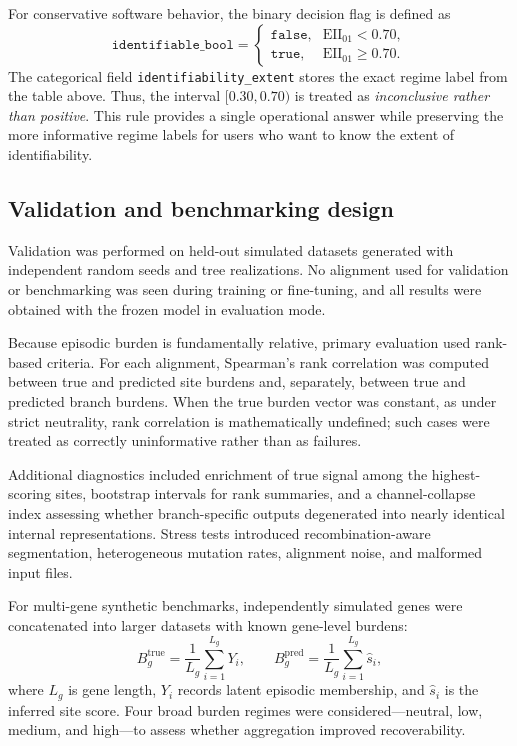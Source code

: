 \documentclass[11pt]{article}
\begin{document}
For conservative software behavior, the binary decision flag is defined as
\[
\texttt{identifiable\_bool}=\begin{cases}
\texttt{false}, & \mathrm{EII}_{01}<0.70,\\
\texttt{true}, & \mathrm{EII}_{01}\ge 0.70.
\end{cases}
\]
The categorical field \texttt{identifiability\_extent} stores the exact regime label from the table above. Thus, the interval $[0.30,0.70)$ is treated as \emph{inconclusive rather than positive}. This rule provides a single operational answer while preserving the more informative regime labels for users who want to know the extent of identifiability.

\subsection{Validation and benchmarking design}

Validation was performed on held-out simulated datasets generated with independent random seeds and tree realizations. No alignment used for validation or benchmarking was seen during training or fine-tuning, and all results were obtained with the frozen model in evaluation mode.

Because episodic burden is fundamentally relative, primary evaluation used rank-based criteria. For each alignment, Spearman's rank correlation was computed between true and predicted site burdens and, separately, between true and predicted branch burdens. When the true burden vector was constant, as under strict neutrality, rank correlation is mathematically undefined; such cases were treated as correctly uninformative rather than as failures.

Additional diagnostics included enrichment of true signal among the highest-scoring sites, bootstrap intervals for rank summaries, and a channel-collapse index assessing whether branch-specific outputs degenerated into nearly identical internal representations. Stress tests introduced recombination-aware segmentation, heterogeneous mutation rates, alignment noise, and malformed input files.

For multi-gene synthetic benchmarks, independently simulated genes were concatenated into larger datasets with known gene-level burdens:
\[
B_g^{\mathrm{true}}=\frac{1}{L_g}\sum_{i=1}^{L_g}Y_i,
\qquad
B_g^{\mathrm{pred}}=\frac{1}{L_g}\sum_{i=1}^{L_g}\hat s_i,
\]
where $L_g$ is gene length, $Y_i$ records latent episodic membership, and $\hat s_i$ is the inferred site score. Four broad burden regimes were considered---neutral, low, medium, and high---to assess whether aggregation improved recoverability.
\end{document}
